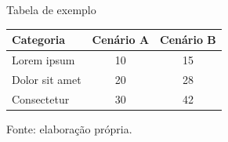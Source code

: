 \begin{frame}{Tabela de exemplo}
  \centering
  \begin{tabular}{lcc}
    \toprule
    \textbf{Categoria} & \textbf{Cenário A} & \textbf{Cenário B} \\
    \midrule
    Lorem ipsum & 10 & 15 \\
    Dolor sit amet & 20 & 28 \\
    Consectetur & 30 & 42 \\
    \bottomrule
  \end{tabular}

  \vspace{0.6cm}
  \small Fonte: elaboração própria.
\end{frame}